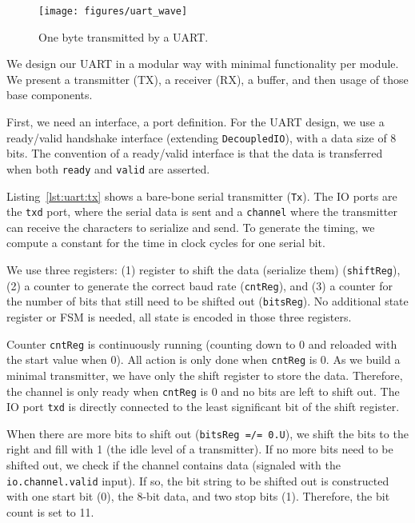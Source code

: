 \documentclass[%
    10pt,
    headinclude, footexclude,
    openright, %
    notitlepage,
    cleardoubleempty,
    headsepline,
    pointlessnumbers,
    bibtotoc, idxtotoc,
    ]{scrbook}
\newcommand{\code}[1]{{\lstinline[basicstyle=\small\ttfamily]{#1}}}
\begin{document}
\begin{figure}
  \centering
  \texttt{[image: figures/uart\_wave]}
  \caption{One byte transmitted by a UART.}
  \label{fig:uart:wave}
\end{figure}

We design our UART in a modular way with minimal functionality
per module. We present a transmitter (TX), a receiver (RX),
a buffer, and then usage of those base components.

First, we need an interface, a port definition.
For the UART design, we use a ready/valid handshake interface (extending \code{DecoupledIO}),
with a data size of 8 bits.
\noindent The convention of a ready/valid interface is that the data is transferred
when both \code{ready} and \code{valid} are asserted.


Listing~\ref{lst:uart:tx} shows a bare-bone serial transmitter (\code{Tx}).
The IO ports are the \code{txd} port, where the serial data is sent and
a \code{channel} where the transmitter can receive the characters to serialize
and send.
To generate the timing, we compute a constant for
the time in clock cycles for one serial bit.

We use three registers:
(1) register to shift the data (serialize them) (\code{shiftReg}),
(2) a counter to generate the correct baud rate (\code{cntReg}), and
(3) a counter for the number of bits that still need to be shifted out (\code{bitsReg}).
No additional state register or FSM is needed, all state is encoded in
those three registers.

Counter \code{cntReg} is continuously running (counting down to 0
and reloaded with the start value when 0). All action is only done when
\code{cntReg} is 0. As we build a minimal transmitter, we have only
the shift register to store the data. Therefore, the channel is only ready
when \code{cntReg} is 0 and no bits are left to shift out.
The IO port \code{txd} is directly connected to the least significant bit
of the shift register.

When there are more bits to shift out (\code{bitsReg =/= 0.U}),
we shift the bits to the right and fill with 1 (the idle level
of a transmitter).
If no more bits need to be shifted out, we check if the channel contains
data (signaled with the \code{io.channel.valid} input). If so, the bit string to
be shifted out is constructed with one start bit (0), the 8-bit data, and
two stop bits (1). Therefore, the bit count is set to 11.
\end{document}
